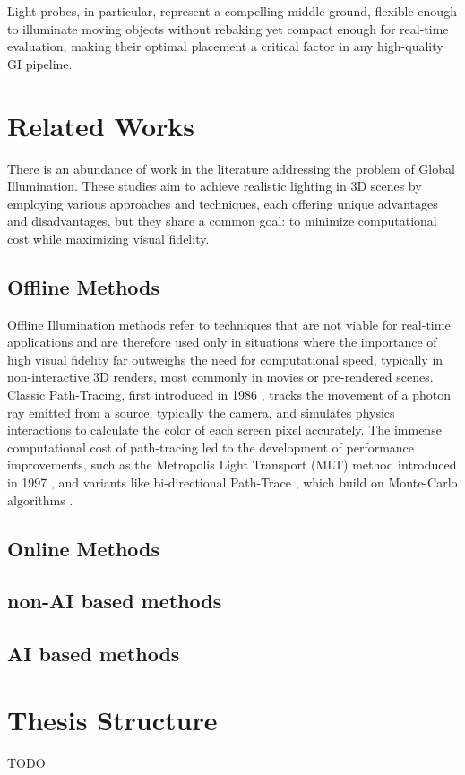 Light probes, in particular, represent a compelling middle-ground, flexible enough to illuminate moving objects without rebaking yet compact enough for real-time evaluation, making their optimal placement a critical factor in any high-quality GI pipeline.


\pagebreak %

\section{Related Works}
There is an abundance of work in the literature addressing the problem of Global Illumination. These studies aim to achieve realistic lighting in 3D scenes by employing various approaches and techniques, each offering unique advantages and disadvantages, but they share a common goal: to minimize computational cost while maximizing visual fidelity.

\subsection{Offline Methods}
Offline Illumination methods refer to techniques that are not viable for real-time applications and are therefore used only in situations where the importance of high visual fidelity far outweighs the need for computational speed, typically in non-interactive 3D renders, most commonly in movies or pre-rendered scenes. Classic Path-Tracing, first introduced in 1986 \parencite{Kajiya1986}, tracks the movement of a photon ray emitted from a source, typically the camera, and simulates physics interactions to calculate the color of each screen pixel accurately. The immense computational cost of path-tracing led to the development of performance improvements, such as the Metropolis Light Transport (MLT) method introduced in 1997 \parencite{Veach1997}, and variants like bi-directional Path-Trace \parencite{Lafortune1993}, which build on Monte-Carlo algorithms \parencite{Lafortune1996}.

\subsection{Online Methods} %

\subsection*{non-AI based methods}

\subsection*{AI based methods}


\section{Thesis Structure}
TODO